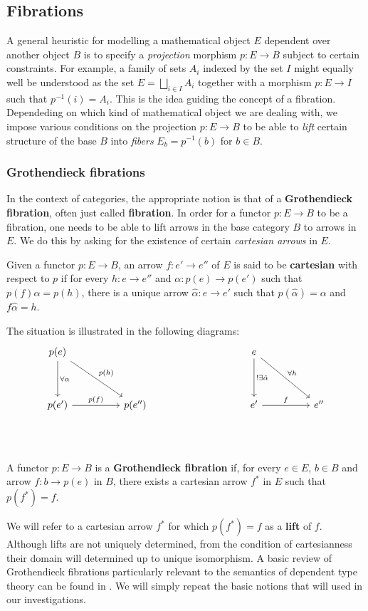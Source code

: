 \subsection{Fibrations}
A general heuristic for modelling a mathematical object $E$ dependent over another object $B$ is to specify a \textit{projection} morphism $p : E \to B$ subject to certain constraints. For example, a family of sets $A_i$ indexed by the set $I$ might equally well be understood as the set $E = \bigsqcup_{i \in I}A_i$ together with a morphism $p : E  \to I$ such that $p^{-1}(i) = A_i$. This is the idea guiding the concept of a fibration. Dependeding on which kind of mathematical object we are dealing with, we impose various conditions on the projection $p : E \to B$ to be able to \textit{lift} certain structure of the base $B$ into \textit{fibers} $E_b = p^{-1}(b)$ for $b \in B$.

\subsubsection{Grothendieck fibrations}
In the context of categories, the appropriate notion is that of a \textbf{Grothendieck fibration}, often just called \textbf{fibration}. In order for a functor $p : E \to B$ to be a fibration, one needs to be able to lift arrows in the base category $B$ to arrows in $E$. We do this by asking for the existence of certain \textit{cartesian arrows} in $E$.
\begin{defn}
Given a functor $p : E \to B$, an arrow $f : e' \to e''$ of $E$ is said to be \textbf{cartesian} with respect to $p$ if for every $h : e \to e''$ and $\alpha : p(e) \to p(e')$ such that $p(f)\alpha = p(h)$, there is a unique arrow $\hat \alpha : e \to e'$ such that $p(\hat \alpha) = \alpha$ and $f \hat \alpha = h$.
\end{defn}
The situation is illustrated in the following diagrams:
\[
\ti
p(e) \ar[d, "\forall \alpha"] \ar[dr, "p(h)"] & & & e \ar[d, "!\exists \hat \alpha"] \ar[dr, "\forall h"] \\
p(e') \ar[r, "p(f)"] & p(e'') & & e' \ar[r, "f"] & e''\\
\kz
\]
\begin{defn}
A functor $p: E \to B$ is a \textbf{Grothendieck fibration} if, for every $e \in E$, $b \in B$ and arrow $f : b \to p(e)$ in $B$, there exists a cartesian arrow $f^*$ in $E$ such that $p(f^*) = f$.
\end{defn}
We will refer to a cartesian arrow $f^*$ for which $p(f^*) = f$ as a \textbf{lift} of $f$. Although lifts are not uniquely determined, from the condition of cartesianness their domain will determined up to unique isomorphism. 
A basic review of Grothendieck fibrations particularly relevant to the semantics of dependent type theory can be found in \cite{jacobs}. We will simply repeat the basic notions that will used in our investigations.
\\

